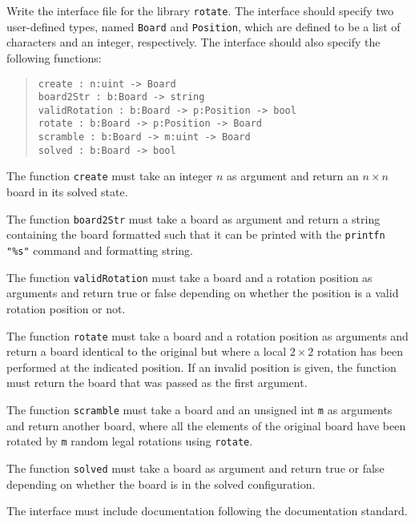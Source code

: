 Write the interface file for the library \lstinline{rotate}. The interface should specify two user-defined types, named \lstinline{Board} and \lstinline{Position}, which are defined to be a list of characters and an integer, respectively. The interface should also specify the following functions:
\begin{quote}
  \lstinline{create : n:uint -> Board}
  \\\lstinline{board2Str : b:Board -> string}
  \\\lstinline{validRotation : b:Board -> p:Position -> bool}
  \\\lstinline{rotate : b:Board -> p:Position -> Board}
  \\\lstinline{scramble : b:Board -> m:uint -> Board}
  \\\lstinline{solved : b:Board -> bool}
\end{quote}
The function \lstinline{create} must take an integer $n$ as argument and return an $n\times n$ board in its solved state.

The function \lstinline{board2Str} must take a board as argument and return a string containing the board formatted such that it can be printed with the \lstinline{printfn "%s"} command and formatting string.

The function \lstinline{validRotation} must take a board and a rotation position as arguments and return true or false depending on whether the position is a valid rotation position or not.

The function \lstinline{rotate} must take a board and a rotation position as arguments and return a board identical to the original but where a local $2\times 2$ rotation has been performed at the indicated position. If an invalid position is given, the function must return the board that was passed as the first argument.

The function \lstinline{scramble} must take a board and an unsigned int \lstinline{m} as arguments and return another board, where all the elements of the original board have been rotated by \lstinline{m} random legal rotations using \lstinline{rotate}.

The function \lstinline{solved} must take a board as argument and return true or false depending on whether the board is in the solved configuration.

The interface must include documentation following the documentation standard.
